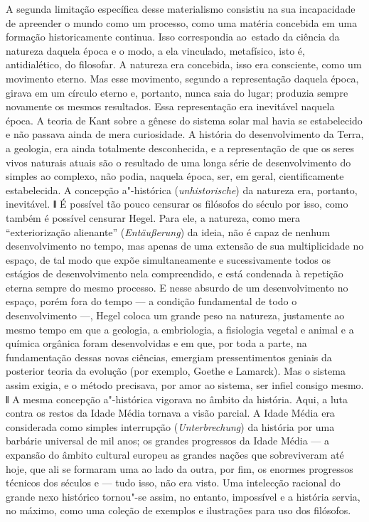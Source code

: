 A segunda limitação específica desse materialismo consistiu na sua
incapacidade de apreender o mundo como um processo, como uma matéria
concebida em uma formação historicamente continua. Isso correspondia ao\est\
estado da ciência da natureza daquela época e o modo, a ela vinculado,
metafísico, isto é, antidialético, do filosofar. A natureza era
concebida, isso era consciente, como um movimento eterno. Mas esse
movimento, segundo a representação daquela época, girava em um círculo
eterno e, portanto, nunca saia do lugar; produzia sempre novamente os
mesmos resultados. Essa representação era inevitável naquela época. A
teoria
de Kant sobre
a gênese do sistema solar mal havia se estabelecido e não passava ainda
de mera curiosidade. A história do desenvolvimento da Terra, a geologia,
era ainda totalmente desconhecida, e a representação de que os seres
vivos naturais atuais são o resultado de uma longa série de
desenvolvimento do simples ao complexo, não podia, naquela época, ser,
em geral, cientificamente estabelecida. A concepção a"-histórica
(\emph{unhistorische}) da natureza era, portanto, inevitável. \textbf{ǁ}
É possível tão pouco censurar os filósofos do século \versal{XVIII} por isso,
como também é possível censurar Hegel. Para ele, a natureza, como mera
``exteriorização alienante'' (\emph{Entäußerung}) da ideia, não é capaz
de nenhum desenvolvimento no tempo, mas apenas de uma extensão de sua
multiplicidade no espaço, de tal modo que expõe simultaneamente e
sucessivamente todos os estágios de desenvolvimento nela compreendido, e
está condenada à repetição eterna sempre do mesmo processo. E nesse
absurdo de um desenvolvimento no espaço, porém fora do tempo --- a
condição fundamental de todo o desenvolvimento ---,
Hegel coloca
um grande peso na natureza, justamente ao mesmo tempo em que a geologia,
a embriologia, a fisiologia vegetal e animal e a química orgânica foram
desenvolvidas e em que, por toda a parte, na fundamentação dessas novas
ciências, emergiam pressentimentos geniais da posterior teoria da
evolução (por
exemplo, Goethe e Lamarck).
Mas o sistema assim exigia, e o método precisava, por amor ao sistema,
ser infiel consigo mesmo. \textbf{ǁ} A mesma concepção a"-histórica
vigorava no âmbito da história. Aqui, a luta contra os restos da Idade
Média tornava a visão parcial. A Idade Média era considerada como
simples interrupção (\emph{Unterbrechung}) da história por uma barbárie
universal de mil anos; os grandes progressos da Idade Média --- a expansão
do âmbito cultural europeu as grandes nações que sobreviveram até hoje,
que ali se formaram uma ao lado da outra, por fim, os enormes progressos
técnicos dos séculos \versal{XIV} e \versal{XV} --- tudo isso, não era visto. Uma intelecção
racional do grande nexo histórico tornou"-se assim, no entanto,
impossível e a história servia, no máximo, como uma coleção de exemplos
e ilustrações para uso dos filósofos.

